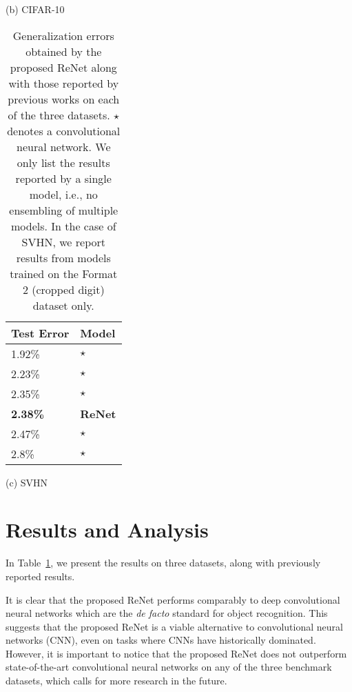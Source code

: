 \documentclass{article} \usepackage{nips15submit_e,times}
\begin{document}
\begin{table}[ht]
\begin{minipage}{0.45\textwidth}
        \vspace{2mm}
        (b) CIFAR-10
    \end{minipage}

    \vspace{4mm}
    \begin{minipage}{0.45\textwidth}
        \centering
        \begin{tabular}{l |  l}
            Test Error & Model  \\
            \hline
1.92\% & \citep{DBLP:journals/corr/LeeXGZT14}$\star$ \\
2.23\% & \citep{DBLP:conf/icml/WanZZLF13}$\star$ \\
2.35\% & \citep{Lin2014}$\star$ \\
\bf{2.38\%} & \bf{ReNet} \\
2.47\% & \citep{Goodfellow2013}$\star$ \\
2.8\% & \citep{DBLP:journals/corr/abs-1301-3557}$\star$ \\
        \end{tabular}

        \vspace{2mm}
        (c) SVHN
    \end{minipage}
    \hfill
    \begin{minipage}{0.45\textwidth}
        \caption{Generalization errors obtained by the
            proposed ReNet along with those reported by previous works
            on each of the three datasets. $\star$ denotes a
            convolutional neural network. We only list the results reported by a single
            model, i.e., no ensembling of multiple models.
            In the case of SVHN, we report results from models trained on 
            the Format 2 (cropped digit) dataset only.}
        \label{tbl:result}
    \end{minipage}
\end{table}

\section{Results and Analysis}

In Table~\ref{tbl:result}, we present the results on three datasets, 
along with previously reported results. 

It is clear that the proposed ReNet performs comparably to deep convolutional
neural networks which are the {\it de facto} standard for object recognition.
This suggests that the proposed ReNet is a viable alternative to convolutional
neural networks (CNN), even on tasks where CNNs have historically dominated.
However, it is important to notice that the proposed ReNet does not outperform
state-of-the-art convolutional neural networks on any of the three benchmark
datasets, which calls for more research in the future. 
\end{document}
